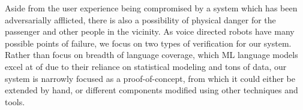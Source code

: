 \documentclass[a4paper, 11pt]{article}
\begin{document}
Aside from the user experience being compromised by a system which has been
adversarially afflicted, there is also a possibility of physical danger for the
passenger and other people in the vicinity. As voice directed robots have many
possible points of failure, we focus on two types of verification for our
system. Rather than focus on breadth of language coverage, which ML language
models excel at of due to their reliance on statistical modeling and tons
of data, our system is narrowly focused as a proof-of-concept, from which it
could either be extended by hand, or different components modified using
other techniques and tools.



\printbibliography
\end{document}
